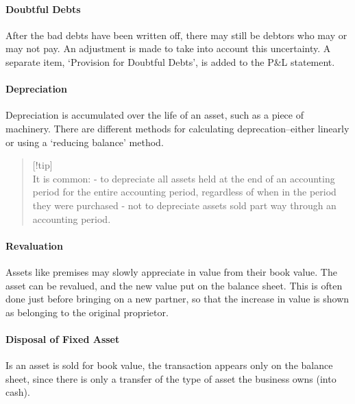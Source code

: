 \documentclass[
]{article}
\begin{document}
\hypertarget{doubtful-debts}{%
\paragraph{Doubtful Debts}\label{doubtful-debts}}

After the bad debts have been written off, there may still be debtors
who may or may not pay. An adjustment is made to take into account this
uncertainty. A separate item, `Provision for Doubtful Debts', is added
to the P\&L statement.

\hypertarget{depreciation}{%
\paragraph{Depreciation}\label{depreciation}}

Depreciation is accumulated over the life of an asset, such as a piece
of machinery. There are different methods for calculating
deprecation--either linearly or using a `reducing balance' method.

\begin{quote}
{[}!tip{]}\\
It is common: - to depreciate all assets held at the end of an
accounting period for the entire accounting period, regardless of when
in the period they were purchased - not to depreciate assets sold part
way through an accounting period.
\end{quote}

\hypertarget{revaluation}{%
\paragraph{Revaluation}\label{revaluation}}

Assets like premises may slowly appreciate in value from their book
value. The asset can be revalued, and the new value put on the balance
sheet. This is often done just before bringing on a new partner, so that
the increase in value is shown as belonging to the original proprietor.

\hypertarget{disposal-of-fixed-asset}{%
\paragraph{Disposal of Fixed Asset}\label{disposal-of-fixed-asset}}

Is an asset is sold for book value, the transaction appears only on the
balance sheet, since there is only a transfer of the type of asset the
business owns (into cash).
\end{document}
